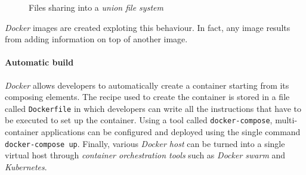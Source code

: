 \begin{figure}[h!]
    \centering
    \captionsetup[subfloat]{singlelinecheck=false, width=40mm,
    justification=raggedright}
    \hspace{1.5cm}
    \hspace{1.5cm}
    \caption{Files sharing into a \emph{union file system}}
\end{figure}

\noindent
\emph{Docker} images are created exploting this behaviour. In fact, any
image results from adding information on top of another image.

\paragraph{Automatic build}
\emph{Docker} allows developers to automatically create a container starting from
its composing elements. The recipe used to create the container is stored in a
file called \texttt{Dockerfile} in which developers can write all the
instructions that have to be executed to set up the container. Using a tool
called \texttt{docker-compose}, multi-container applications can be configured
and deployed using the single command \texttt{docker-compose up}. Finally,
various \emph{Docker host} can be turned into a single virtual host through
\emph{container orchestration tools} such as \emph{Docker swarm} and
\emph{Kubernetes}.